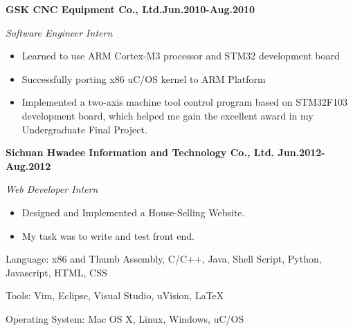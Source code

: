 \documentclass{myres}
\begin{document}
{
	\textbf{GSK CNC Equipment Co., Ltd.\hfill Jun.2010-Aug.2010}
	\par
	{\it Software Engineer Intern}
  \begin{itemize}[topsep=0pt, leftmargin=0.2in] \itemsep -5pt
			\item Learned to use ARM Cortex-M3 processor and STM32 development board
			\item Successfully porting x86 uC/OS kernel to ARM Platform
			\item Implemented a two-axis machine tool control program based on
				STM32F103 development board, which helped me gain the excellent award in my
				Undergraduate Final Project.
	\end{itemize}
	\par
	\smallskip
	\textbf{Sichuan Hwadee Information and Technology Co., Ltd. \hfill Jun.2012-Aug.2012}
	\par
	{\it Web Developer Intern}
  \begin{itemize}[topsep=0pt, leftmargin=0.2in] \itemsep -5pt
		\item Designed and Implemented a House-Selling Website.
		\item My task was to write and test front end.
	\end{itemize}
	\par
}
{
	Language: x86 and Thumb Assembly, C/C++, Java, Shell Script, Python, Javascript, HTML, CSS
	\par
	Tools: Vim, Eclipse, Visual Studio, uVision, \LaTeX
	\par
	Operating System: Mac OS X, Linux, Windows, uC/OS
}
%
\end{document}
